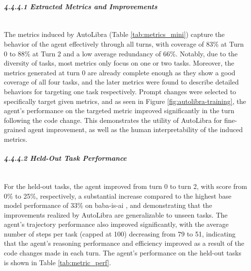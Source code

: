 \paragraph{\textit{4.4.4.1 Extracted Metrics and Improvements}}~\newline 
\\The metrics induced by AutoLibra (Table \ref{tab:metrics_mini}) capture the behavior of the agent effectively through all turns, with coverage of 83\% at Turn 0 to 88\% at Turn 2 and a low average redundancy of 66\%. Notably, due to the diversity of tasks, most metrics only focus on one or two tasks. Moreover, the metrics generated at turn 0 are already complete enough as they show a good coverage of all four tasks, and the later metrics were found to describe detailed behaviors for targeting one task respectively. Prompt changes were selected to specifically target given metrics, and as seen in Figure \ref{fig:autolibra-training}, the agent's performance on the targeted metric improved significantly in the turn following the code change. This demonstrates the utility of AutoLibra for fine-grained agent improvement, as well as the human interpretability of the induced metrics.


\paragraph{\textit{4.4.4.2 Held-Out Task Performance}}~\newline 
\\For the held-out tasks, the agent improved from turn 0 to turn 2, with score from 0\% to 25\%, respectively, a substantial increase compared to the highest base model performance of 33\% on baba-is-ai \cite{paglieri2024balrog}, and demonstrating that the improvements realized by AutoLibra are generalizable to unseen tasks. The agent's trajectory performance also improved significantly, with the average number of steps per task (capped at 100) decreasing from 79 to 51, indicating that the agent's reasoning performance and efficiency improved as a result of the code changes made in each turn. The agent's performance on the held-out tasks is shown in Table \ref{tab:metric_perf}.


